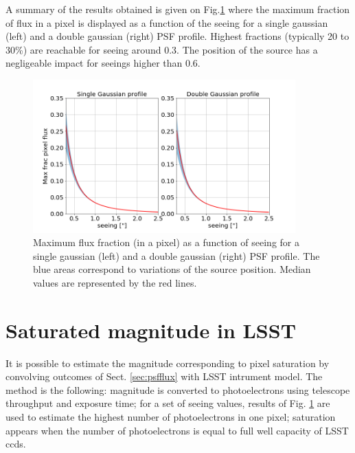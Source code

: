 \documentclass[\docopts]{\docclass}
\begin{document}
A summary of the results obtained is given on Fig.\ref{fig:fracseeing} where the maximum fraction of flux in a pixel is displayed as a function of the seeing for a single gaussian (left) and a double gaussian (right) PSF profile. Highest fractions (typically 20 to 30\%) are reachable for seeing around 0.3\arcsec. The position of the source has a negligeable impact for seeings higher than 0.6\arcsec.
\begin{figure}[htbp]
\begin{center}
  \includegraphics[width=0.9\textwidth]{max_frac_seeing.png}
 \caption{Maximum flux fraction (in a pixel) as a function of seeing for a single gaussian (left) and a double gaussian (right) PSF profile. The blue areas correspond to variations of the source position. Median values are represented by the red lines.}\label{fig:fracseeing}
\end{center}
\end{figure}


\section{Saturated magnitude in LSST}
\label{sec:magsaturation}

It is possible to estimate the magnitude corresponding to pixel saturation by convolving  outcomes of Sect. \ref{sec:psfflux} with LSST intrument model. The method is the following:  magnitude is converted to photoelectrons using telescope throughput and exposure time; for a set of seeing values, results of Fig. \ref{fig:fracseeing} are used to estimate the highest number of photoelectrons in one pixel; saturation appears when the number of photoelectrons is equal to full well capacity of LSST ccds. 
\end{document}
